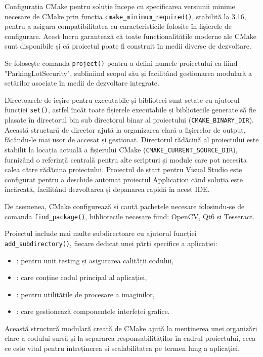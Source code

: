\documentclass[a4paper,12pt]{report}
\begin{document}
Configurația CMake pentru soluție începe cu specificarea versiunii minime necesare de CMake prin funcția \texttt{cmake\_minimum\_required()}, stabilită la 3.16, pentru a asigura compatibilitatea cu caracteristicile folosite în fișierele de configurare. Acest lucru garantează că toate funcționalitățile moderne ale CMake sunt disponibile și că proiectul poate fi construit în medii diverse de dezvoltare.

Se folosește comanda \texttt{project()} pentru a defini numele proiectului ca fiind "ParkingLotSecurity", subliniind scopul său și facilitând gestionarea modulară a setărilor asociate în medii de dezvoltare integrate.

Directoarele de ieșire pentru executabile și biblioteci sunt setate cu ajutorul funcției \texttt{set()}, astfel încât toate fișierele executabile și bibliotecile generate să fie plasate în directorul bin sub directorul binar al proiectului (\texttt{CMAKE\_BINARY\_DIR}). Această structură de director ajută la organizarea clară a fișierelor de output, făcându-le mai ușor de accesat și gestionat. Directorul rădăcină al proiectului este stabilit la locația actuală a fișierului CMake (\texttt{CMAKE\_CURRENT\_SOURCE\_DIR}), furnizând o referință centrală pentru alte scripturi și module care pot necesita calea către rădăcina proiectului. Proiectul de start pentru Visual Studio este configurat pentru a deschide automat proiectul Application când soluția este încărcată, facilitând dezvoltarea și depanarea rapidă în acest IDE.

De asemenea, CMake configurează și caută pachetele necesare folosindu-se de comanda \texttt{find\_package()}, bibliotecile necesare fiind: OpenCV, Qt6 și Tesseract.

Proiectul include mai multe subdirectoare cu ajutorul funcției \texttt{add\_subdirectory()}, fiecare dedicat unei părți specifice a aplicației:
\begin{itemize}
    \item {}: pentru unit testing și asigurarea calității codului,
    \item {}: care conține codul principal al aplicației,
    \item {}: pentru utilitățile de procesare a imaginilor,
    \item {}: care gestionează componentele interfeței grafice.
\end{itemize}

Această structură modulară creată de CMake ajută la menținerea unei organizări clare a codului sursă și la separarea responsabilităților în cadrul proiectului, ceea ce este vital pentru întreținerea și scalabilitatea pe termen lung a aplicației.
\end{document}
